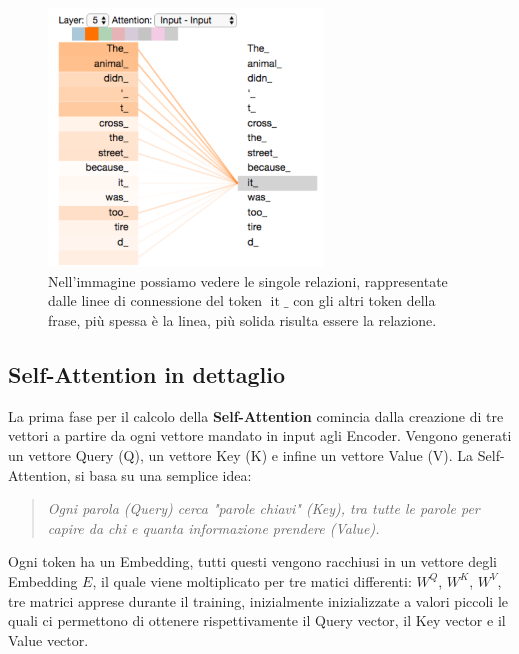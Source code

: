 \begin{figure}
    \centering
    \includegraphics[width=0.65\textwidth]{figure/selfAttention}
    \caption{Nell'immagine possiamo vedere le singole relazioni, rappresentate dalle linee di connessione del token $\operatorname{it}\_$ con gli altri token della frase, più spessa è la linea, più solida risulta essere la relazione.}
    \label{fig:selfAtt}
\end{figure}


\subsection{Self-Attention in dettaglio}

La prima fase per il calcolo della \textbf{Self-Attention} comincia dalla creazione di tre vettori a partire da ogni vettore mandato in input agli Encoder. Vengono generati un vettore Query (Q), un vettore Key (K) e infine un vettore Value (V). La Self-Attention, si basa su una semplice idea: 

\begin{quote}
    \textit{Ogni parola (Query) cerca "parole chiavi" (Key), tra tutte le parole per capire da chi e quanta informazione prendere (Value).}
\end{quote}

Ogni token ha un Embedding, tutti questi vengono racchiusi in un vettore degli Embedding $E$, il quale viene moltiplicato per tre matici differenti: $W^Q$, $W^K$, $W^V$, tre matrici apprese durante il training, inizialmente inizializzate a valori piccoli le quali ci permettono di ottenere rispettivamente il Query vector, il Key vector e il Value vector.

